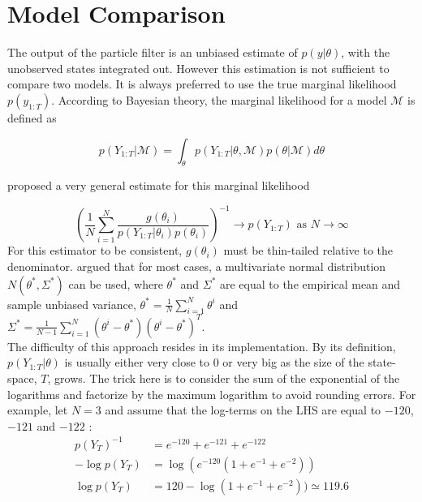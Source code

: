 \documentclass[11pt,a4,twosided,singlespacing,titlepagenumber=on]{scrreprt}
\numberwithin{equation}{chapter} %
\theoremstyle{remark}
\begin{document}
\section{Model Comparison}
The output of the particle filter is an unbiased estimate of $p(y|\theta)$, with the unobserved states integrated out. However this estimation is not sufficient to compare two models. It is always preferred to use the true marginal likelihood $p(y_{1:T})$. According to Bayesian theory, the marginal likelihood for a model $\mathcal{M}$ is defined as

\begin{equation}
p(Y_{1:T} | \mathcal{M}) = \int_{\theta} p(Y_{1:T} | \theta, \mathcal{M}) p(\theta | \mathcal{M}) d\theta
\end{equation}


\cite{gelfand1994} proposed a very general estimate for this marginal likelihood

\begin{equation}
\left(\frac{1}{N} \sum_{i=1}^N \frac{g(\theta_i)}{p(Y_{1:T} | \theta_i) p(\theta_i)}\right)^{-1} \rightarrow p(Y_{1:T}) \text{ as } N \rightarrow \infty
\end{equation}
For this estimator to be consistent, $g(\theta_i)$ must be thin-tailed relative to the denominator. \cite{gelfand1994} argued that for most cases, a multivariate normal distribution $N(\theta^*, \Sigma^*)$ can be used, where $\theta^*$ and $\Sigma^*$ are equal to the empirical mean and sample unbiased variance, $\theta^* = \frac{1}{N} \sum_{i=1}^N \theta^i$ and $\Sigma^* = \frac{1}{N-1} \sum_{i=1}^N \left(\theta^i - \theta^*\right)\left(\theta^i - \theta^*\right)^T$. \\


The difficulty of this approach resides in its implementation. By its definition, $p(Y_{1:T} | \theta)$ is usually either very close to 0 or very big as the size of the state-space, $T$, grows. The trick here is to consider the sum of the exponential of the logarithms and factorize by the maximum logarithm to avoid rounding errors. For example, let $N = 3$ and assume that the log-terms on the LHS are equal to $-120$, $-121$ and $-122$ :
\begin{align*}
p(Y_T)^{-1} &= e^{-120} + e^{-121} + e^{-122} \\
- \log p(Y_T) &= \log (e^{-120} ( 1 + e^{-1} + e^{-2})) \\
 \log p(Y_T) &= 120 - \log ( 1 + e^{-1} + e^{-2})) \simeq 119.6
\end{align*}
\end{document}
